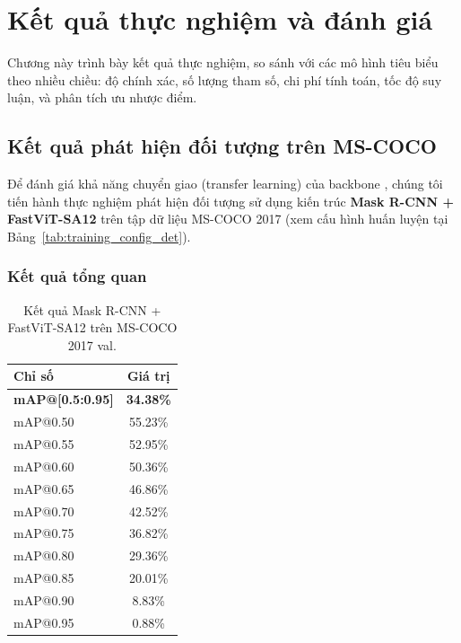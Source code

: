 \chapter{Kết quả thực nghiệm và đánh giá}
\label{chap:results}

Chương này trình bày kết quả thực nghiệm, so sánh \fastvit{} với các mô hình tiêu biểu theo nhiều chiều: độ chính xác, số lượng tham số, chi phí tính toán, tốc độ suy luận, và phân tích ưu nhược điểm.

\section{Kết quả phát hiện đối tượng trên MS-COCO}
\label{sec:detection_results}

Để đánh giá khả năng chuyển giao (transfer learning) của backbone \fastvit{}, chúng tôi tiến hành thực nghiệm phát hiện đối tượng sử dụng kiến trúc \textbf{Mask R-CNN + FastViT-SA12} trên tập dữ liệu MS-COCO 2017 (xem cấu hình huấn luyện tại Bảng~\ref{tab:training_config_det}).

\subsection{Kết quả tổng quan}

\begin{table}[H]
\centering
\caption{Kết quả Mask R-CNN + FastViT-SA12 trên MS-COCO 2017 val.}
\label{tab:coco_results_summary}
\begin{tabular}{l c}
\toprule
\textbf{Chỉ số} & \textbf{Giá trị} \\
\midrule
\textbf{mAP@[0.5:0.95]} & \textbf{34.38\%} \\
mAP@0.50 & 55.23\% \\
mAP@0.55 & 52.95\% \\
mAP@0.60 & 50.36\% \\
mAP@0.65 & 46.86\% \\
mAP@0.70 & 42.52\% \\
mAP@0.75 & 36.82\% \\
mAP@0.80 & 29.36\% \\
mAP@0.85 & 20.01\% \\
mAP@0.90 & 8.83\% \\
mAP@0.95 & 0.88\% \\
\bottomrule
\end{tabular}
\end{table}

